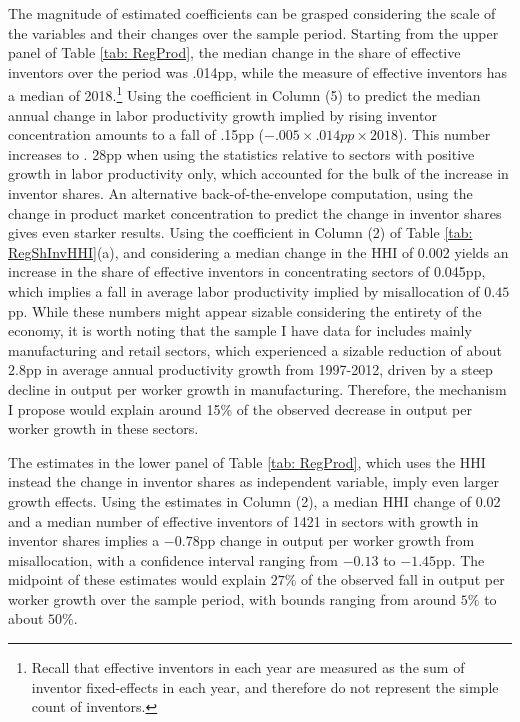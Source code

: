 The magnitude of estimated coefficients can be grasped considering
the scale of the variables and their changes over the sample period.
Starting from the upper panel of Table \ref{tab: RegProd}, the median
change in the share of effective inventors over the period was .014pp,
while the measure of effective inventors has a median of 2018.\footnote{Recall that effective inventors in each year are measured as the sum
of inventor fixed-effects in each year, and therefore do not represent
the simple count of inventors.} Using the coefficient in Column (5) to predict the median annual
change in labor productivity growth implied by rising inventor concentration
amounts to a fall of .15pp ($-.005\times.014pp\times2018$). This
number increases to . 28pp when using the statistics relative to sectors
with positive growth in labor productivity only, which accounted for
the bulk of the increase in inventor shares. An alternative back-of-the-envelope
computation, using the change in product market concentration to predict
the change in inventor shares gives even starker results. Using the
coefficient in Column (2) of Table \ref{tab: RegShInvHHI}(a), and
considering a median change in the HHI of 0.002 yields an increase
in the share of effective inventors in concentrating sectors of 0.045pp,
which implies a fall in average labor productivity implied by misallocation
of $0.45$pp. While these numbers might appear sizable considering
the entirety of the economy, it is worth noting that the sample I
have data for includes mainly manufacturing and retail sectors, which
experienced a sizable reduction of about $2.8$pp in average annual
productivity growth from 1997-2012, driven by a steep decline in output
per worker growth in manufacturing. Therefore, the mechanism I propose
would explain around 15\% of the observed decrease in output per worker
growth in these sectors.

The estimates in the lower panel of Table \ref{tab: RegProd}, which
uses the HHI instead the change in inventor shares as independent
variable, imply even larger growth effects. Using the estimates in
Column (2), a median HHI change of 0.02 and a median number of effective
inventors of 1421 in sectors with growth in inventor shares implies
a $-0.78$pp change in output per worker growth from misallocation,
with a confidence interval ranging from $-0.13$ to $-1.45$pp. The
midpoint of these estimates would explain $27\%$ of the observed
fall in output per worker growth over the sample period, with bounds
ranging from around $5\%$ to about $50\%$.

